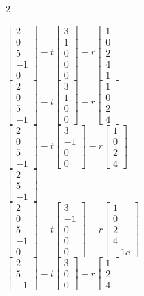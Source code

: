 \documentclass[12pt]{exam}
\newcommand{\ibmatrix}[1]{\begin{bmatrix}#1\end{bmatrix}} %
\begin{document}
\begin{multicols*}{2}
\begin{questions}
		\begin{oneparchoices}
			{
				\def\arraystretch{1.1}
				\choice $\ibmatrix{2\\0\\5\\-1\\0} - t \ibmatrix{3\\1\\0\\0\\0} - r \ibmatrix{1\\0\\2\\4\\1}$\\[+1em]
				\choice $\ibmatrix{2\\0\\5\\-1} - t \ibmatrix{3\\1\\0\\0} - r \ibmatrix{1\\0\\2\\4}$\\[+1em]
				\choice $\ibmatrix{2\\0\\5\\-1} - t \ibmatrix{3\\-1\\0\\0} - r \ibmatrix{1\\0\\2\\4}$\\[+1em]
				\choice $\ibmatrix{2\\5\\-1}$\\[+1em]
				\choice $\ibmatrix{2\\0\\5\\-1\\0} - t \ibmatrix{3\\-1\\0\\0\\0} - r \ibmatrix{1\\0\\2\\4\\-1c}$\\[+1em]
				\choice $\ibmatrix{2\\5\\-1} - t \ibmatrix{3\\0\\0} - r \ibmatrix{1\\2\\4}$\\
			}
		\end{oneparchoices}


\end{questions}
\end{multicols*}
\end{document}
